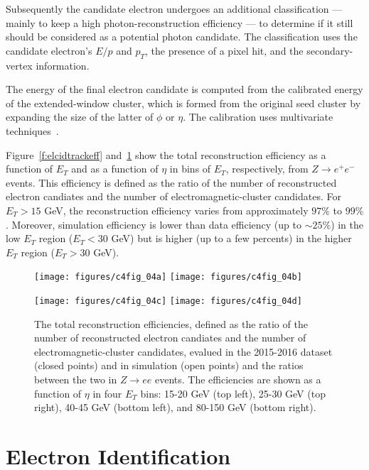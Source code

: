 Subsequently the candidate electron undergoes an additional classification ---
mainly to keep a high photon-reconstruction efficiency --- to determine if it
still should be considered as a potential photon candidate. The classification
uses the candidate electron's $E/p$ and $p_T$, the presence of a pixel hit, and
the secondary-vertex information.

The energy of the final electron candidate is computed from the calibrated
energy of the extended-window cluster, which is formed from the original seed
cluster by expanding the size of the latter of $\phi$ or $\eta$. The
calibration uses multivariate techniques~\cite{elclusecal1, elclusecal2}.

Figure~\ref{f:elcidtrackeff} and~\ref{f:elcidreceff} show the total
reconstruction efficiency as a function of $E_T$ and as a function of $\eta$ in
bins of $E_T$, respectively, from $Z\to e^+e^-$ events. This efficiency is
defined as the ratio of the number of reconstructed electron candiates and the
number of electromagnetic-cluster candidates. For $E_T > 15$ GeV, the
reconstruction efficiency varies from approximately $97\%$ to $99\%$. Moreover,
simulation efficiency is lower than data efficiency (up to $\sim 25\%$) in the
low $E_T$ region ($E_T < 30$ GeV) but is higher (up to a few percents) in the
higher $E_T$ region ($E_T > 30$ GeV).

\begin{figure}[H]
	\texttt{[image: figures/c4fig\_04a]}
	\texttt{[image: figures/c4fig\_04b]}


	\texttt{[image: figures/c4fig\_04c]}
	\texttt{[image: figures/c4fig\_04d]}

	\centering

	\caption{The total reconstruction efficiencies, defined as the ratio of the 
	number of reconstructed electron candiates and the number of electromagnetic-cluster 
	candidates, evalued in the 2015-2016 dataset (closed points) and in simulation (open
		points) and the ratios between the two in $Z\to ee$ events. The efficiencies
		are shown as a function of $\eta$ in four $E_T$ bins: 15-20 GeV (top left),
		25-30 GeV (top right), 40-45 GeV (bottom left), and 80-150 GeV (bottom
		right).}

	\label{f:elcidreceff}

\end{figure}


\section{Electron Identification}\label{s:eid}

